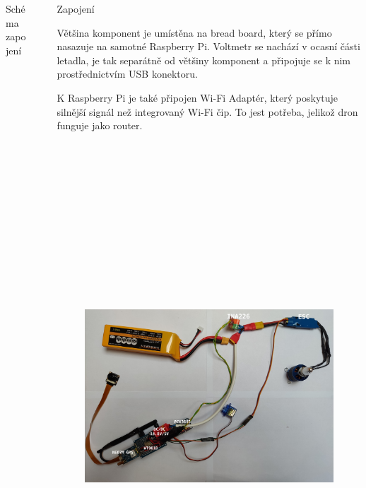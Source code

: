 \documentclass[final]{beamer}
\newlength{\sepwidth}
\newlength{\colwidth}
\newcommand{\separatorcolumn}{\begin{column}{\sepwidth}\end{column}}
\begin{document}
\begin{frame}[t]
\begin{columns}[t]
\begin{column}{\colwidth}
\begin{block}{Schéma zapojení}
      \end{block}

    \end{column}

    \separatorcolumn

    \begin{column}{\colwidth}

			\begin{block}{Zapojení}

				Většina komponent je umístěna na bread board, který se přímo nasazuje na samotné Raspberry Pi.
				Voltmetr se nachází v ocasní části letadla, je tak separátně od většiny komponent a připojuje se k nim prostřednictvím USB konektoru.

				K Raspberry Pi je také připojen Wi-Fi Adaptér, který poskytuje silnější signál než integrovaný Wi-Fi čip.
				To jest potřeba, jelikož dron funguje jako router.

				\begin{figure}[h]
					\centering
					\includegraphics[height=19cm]{./circuit.jpg}
				\end{figure}


\end{block}
\end{column}
\end{columns}
\end{frame}
\end{document}
